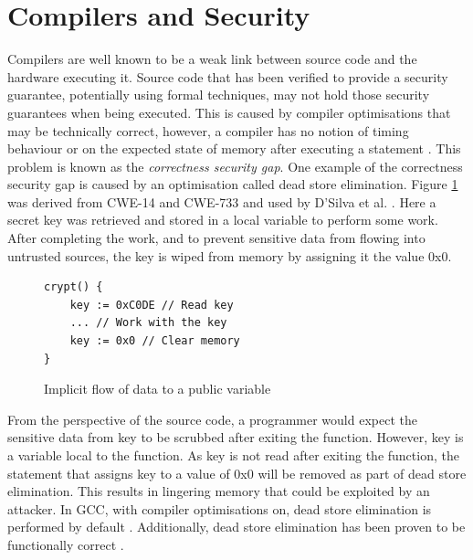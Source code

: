 \documentclass[twocolumn]{article}
\begin{document}
\section{Compilers and Security}
Compilers are well known to be a weak link between source code and the hardware executing it. Source code that has been verified to provide a security guarantee, potentially using formal techniques, may not hold those security guarantees when being executed. This is caused by compiler optimisations that may be technically correct, however, a compiler has no notion of timing behaviour or on the expected state of memory after executing a statement \cite{d2015correctness}. This problem is known as the \textit{correctness security gap}. One example of the correctness security gap is caused by an optimisation called dead store elimination. Figure \ref{fig:deadstore} was derived from CWE-14 \cite{cwe14} and CWE-733 \cite{cwe733} and used by D'Silva et al. \cite{d2015correctness}. Here a secret key was retrieved and stored in a local variable to perform some work. After completing the work, and to prevent sensitive data from flowing into untrusted sources, the key is wiped from memory by assigning it the value 0x0.

\begin{figure}
    \begin{lstlisting}
crypt() {
    key := 0xC0DE // Read key
    ... // Work with the key
    key := 0x0 // Clear memory
}
        \end{lstlisting}
    \caption{Implicit flow of data to a public variable \cite{d2015correctness}}
    \label{fig:deadstore}
\end{figure}

From the perspective of the source code, a programmer would expect the sensitive data from key to be scrubbed after exiting the function. However, key is a variable local to the function. As key is not read after exiting the function, the statement that assigns key to a value of 0x0 will be removed as part of dead store elimination. This results in lingering memory that could be exploited by an attacker. In GCC, with compiler optimisations on, dead store elimination is performed by default \cite{gccoptimise}. Additionally, dead store elimination has been proven to be functionally correct \cite{benton2004simple}\cite{leroy2006formal}.

\end{document}
